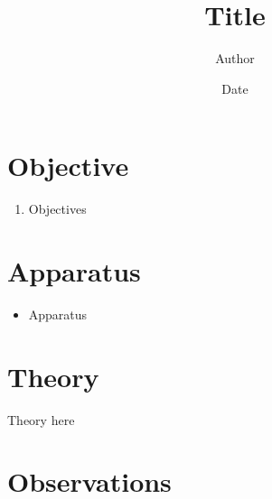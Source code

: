 \documentclass[a4paper]{article}
\title{\textbf{Title}}
\author{Author}
\date{Date}
\begin{document}
\maketitle



\section*{Objective}

\begin{enumerate}
\item Objectives
\end{enumerate}



\section*{Apparatus}



\begin{itemize}
\item Apparatus
\end{itemize}


\section*{Theory}

Theory here

\section*{Observations}
\end{document}
